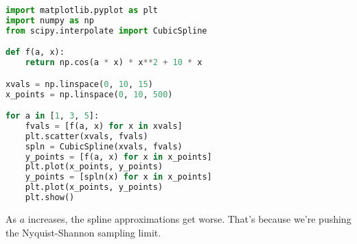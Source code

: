 \documentclass{article}
\begin{document}
\bigskip
\begin{prob}
\end{prob}
\begin{lstlisting}[language=Python]
import matplotlib.pyplot as plt
import numpy as np
from scipy.interpolate import CubicSpline

def f(a, x):
    return np.cos(a * x) * x**2 + 10 * x

xvals = np.linspace(0, 10, 15)
x_points = np.linspace(0, 10, 500)

for a in [1, 3, 5]:
    fvals = [f(a, x) for x in xvals]
    plt.scatter(xvals, fvals)
    spln = CubicSpline(xvals, fvals)
    y_points = [f(a, x) for x in x_points]
    plt.plot(x_points, y_points)
    y_points = [spln(x) for x in x_points]
    plt.plot(x_points, y_points)
    plt.show()
\end{lstlisting}
As $a$ increases, the spline approximations get worse. That's because we're pushing the Nyquist-Shannon sampling limit.
\end{document}
